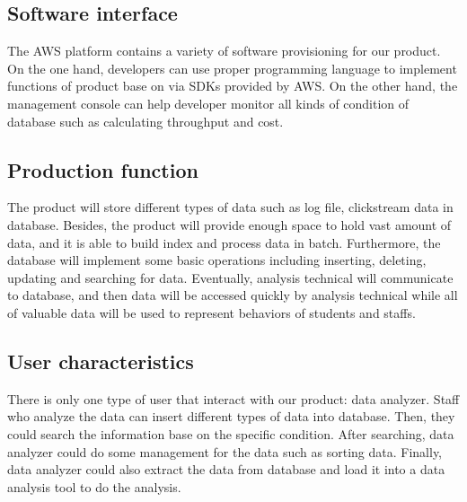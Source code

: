\documentclass[10pt,draftclsnofoot,onecolumn,journal,compsoc]{IEEEtran}
\begin{document}
        \subsection{Software interface}
        The AWS platform contains a variety of software provisioning for our product. On the one hand, developers can use proper programming language to implement functions of product base on via SDKs provided by AWS. On the other hand, the management console can help developer monitor all kinds of condition of database such as calculating throughput and cost. 
       
       \subsection{Production function}
       The product will store different types of data such as log file, clickstream data in database. Besides, the product will provide enough space to hold vast amount of data, and it is able to build index and process data in batch. Furthermore, the database will implement some basic operations including inserting, deleting, updating and searching for data. Eventually, analysis technical will communicate to database, and then data will be accessed quickly by analysis technical while all of valuable data will be used to represent behaviors of students and staffs.

        \subsection{User characteristics}
        There is only one type of user that interact with our product: data analyzer. Staff who analyze the data can insert different types of data into database. Then, they could search the information base on the specific condition. After searching, data analyzer could do some management for the data such as sorting data. Finally, data analyzer could also extract the data from database and load it into a data analysis tool to do the analysis. 
\end{document}
